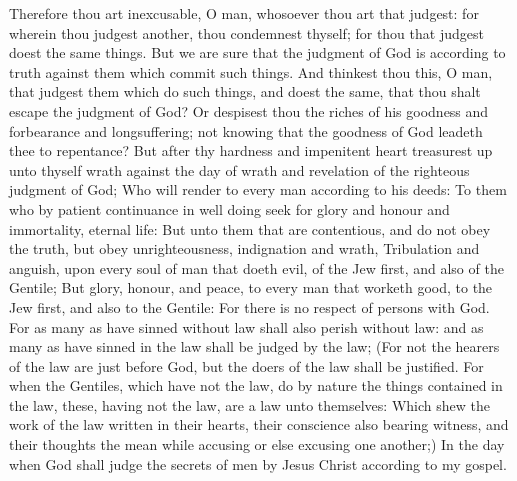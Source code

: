  Therefore thou art inexcusable, O man, whosoever thou art
that judgest: for wherein thou judgest another, thou condemnest thyself;
for thou that judgest doest the same things.  But we are
sure that the judgment of God is according to truth against them which
commit such things.  And thinkest thou this, O man, that
judgest them which do such things, and doest the same, that thou shalt
escape the judgment of God?  Or despisest thou the riches of
his goodness and forbearance and longsuffering; not knowing that the
goodness of God leadeth thee to repentance?  But after thy
hardness and impenitent heart treasurest up unto thyself wrath against
the day of wrath and revelation of the righteous judgment of God;
 Who will render to every man according to his deeds:
 To them who by patient continuance in well doing seek for
glory and honour and immortality, eternal life:  But unto
them that are contentious, and do not obey the truth, but obey
unrighteousness, indignation and wrath,  Tribulation and
anguish, upon every soul of man that doeth evil, of the Jew first, and
also of the Gentile;  But glory, honour, and peace, to
every man that worketh good, to the Jew first, and also to the Gentile:
 For there is no respect of persons with God. 
For as many as have sinned without law shall also perish without law:
and as many as have sinned in the law shall be judged by the law;
 (For not the hearers of the law are just before God, but
the doers of the law shall be justified.  For when the
Gentiles, which have not the law, do by nature the things contained in
the law, these, having not the law, are a law unto themselves:
 Which shew the work of the law written in their hearts,
their conscience also bearing witness, and their thoughts the mean while
accusing or else excusing one another;)  In the day when
God shall judge the secrets of men by Jesus Christ according to my
gospel.

